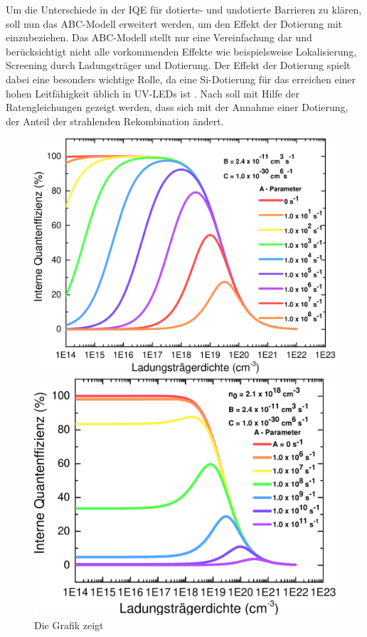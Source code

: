 Um die Unterschiede in der IQE für dotierte- und undotierte Barrieren zu klären, soll nun das ABC-Modell erweitert werden, um den Effekt der Dotierung mit einzubeziehen. 
Das ABC-Modell stellt nur eine Vereinfachung dar und berücksichtigt nicht alle vorkommenden Effekte wie beispielsweise Lokalisierung, Screening durch Ladungsträger und Dotierung. 
Der Effekt der Dotierung spielt dabei eine besonders wichtige Rolle, da eine Si-Dotierung für das erreichen einer hohen Leitfähigkeit üblich in UV-LEDs ist \cite{doi:10.1063/1.1492316}.
Nach \cite{schub} soll mit Hilfe der Ratengleichungen gezeigt werden, dass sich mit der Annahme einer Dotierung,
der Anteil der strahlenden Rekombination ändert.
\newline
\begin{figure}[H]
    \centering
    \begin{minipage}[t]{0.49\linewidth}
        \centering
        \includegraphics[width=\linewidth]{Bilder/IQEohneDotierungVerschAParams.pdf}
        \caption{Die Grafik zeigt}
        \label{fig:iqenorm}
    \end{minipage}%
    \hfill
    \begin{minipage}[t]{0.49\linewidth}
        \centering
        \includegraphics[width=\linewidth]{Bilder/IQEmitDotierungVerschAParams.pdf}

\end{minipage}
\end{figure}
